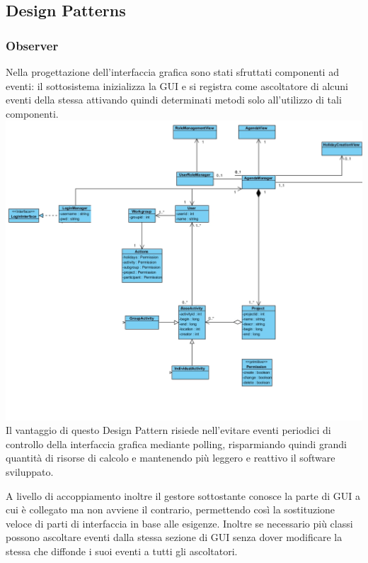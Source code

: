\documentclass[12pt]{scrartcl}
\begin{document}
\subsection{Design Patterns}
\subsubsection{Observer}
    Nella progettazione dell'interfaccia grafica sono stati sfruttati
    componenti ad eventi: il sottosistema inizializza la GUI e si registra
    come ascoltatore di alcuni eventi della stessa attivando quindi 
    determinati metodi solo all'utilizzo di tali componenti.\\
    \includegraphics[scale=0.40]{0.png}
Il vantaggio di questo Design Pattern risiede nell'evitare eventi
periodici di controllo della interfaccia grafica mediante polling,
risparmiando quindi grandi quantit\`a di risorse di calcolo e mantenendo
pi\`u leggero e reattivo il software sviluppato.

A livello di accoppiamento inoltre il gestore sottostante conosce
la parte di GUI a cui \`e collegato ma non avviene il contrario, 
permettendo cos\`i la sostituzione veloce di parti di interfaccia
in base alle esigenze. Inoltre se necessario pi\`u classi possono
ascoltare eventi dalla stessa sezione di GUI senza dover modificare
la stessa che diffonde i suoi eventi a tutti gli ascoltatori.
\end{document}
